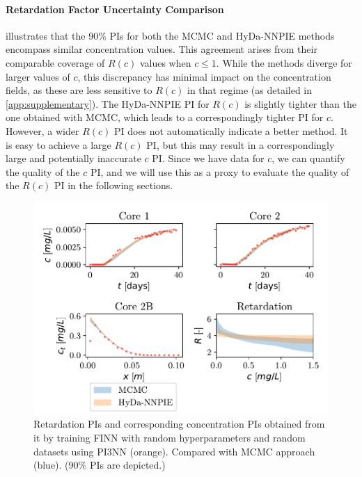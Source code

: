 \paragraph{Retardation Factor Uncertainty Comparison}
 illustrates that the 90\% PIs for both the MCMC and HyDa-NNPIE methods encompass similar concentration values. This agreement arises from their comparable coverage of $R(c)$ values when $c \leq 1$. While the methods diverge for larger values of $c$, this discrepancy has minimal impact on the concentration fields, as these are less sensitive to $R(c)$ in that regime (as detailed in \cref{app:supplementary}).
The HyDa-NNPIE PI for $R(c)$ is slightly tighter than the one obtained with MCMC, which leads to a correspondingly tighter PI for $c$. However, a wider $R(c)$ PI does not automatically indicate a better method. It is easy to achieve a large $R(c)$ PI, but this may result in a correspondingly large and potentially inaccurate $c$ PI. Since we have data for $c$, we can quantify the quality of the $c$ PI, and we will use this as a proxy to evaluate the quality of the $R(c)$ PI in the following sections.

\begin{figure}[h!]
    \centering
    \includegraphics{figs/finn_MCMCvsFull-SPAN_PIs.pdf}
    \caption{Retardation PIs and corresponding concentration PIs obtained from it by training FINN with random hyperparameters and random datasets using PI3NN (orange). Compared with MCMC approach (blue). (90\% PIs are depicted.)}
    \label{fig:mcmc_vs_fullspan}
\end{figure}


